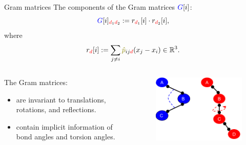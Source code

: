 \documentclass{beamer}
\begin{document}
\begin{frame}{Gram matrices}
\fontsize{10}{6}\selectfont
    The components of the Gram matrices ${\color{blue}G}[i]$:
    \begin{equation}
        {\color{blue}G}[i]_{{\color{red}d}_1{\color{red}d}_2} := r_{{\color{red}d}_1}[i] \cdot r_{{\color{red}d}_2}[i],
    \end{equation}
    where
    \begin{equation}
        r_{\color{red}d}[i] := \sum_{j \neq i} {\color{olive}\hat{p}}_{ij{\color{red}d}}(x_j - x_i) \in \mathbb{R}^3.
    \end{equation}
    \begin{columns}
        \begin{column}{0.5\textwidth}
            \fontsize{9}{6}\selectfont
            The Gram matrices:
            \begin{itemize}
                \item are invariant to translations, rotations, and reflections.
                \item contain implicit information of {\color{blue}bond angles} and {\color{red}torsion angles}.
            \end{itemize}
        \end{column}
        \begin{column}{0.5\textwidth}
            \begin{figure}[H]
                \centering
                    \includegraphics[scale=0.3]{img/slide/angles.png}
                \label{fig:triatom_covalent}
            \end{figure}
        \end{column}
    \end{columns}
    
\end{frame}
\end{document}
